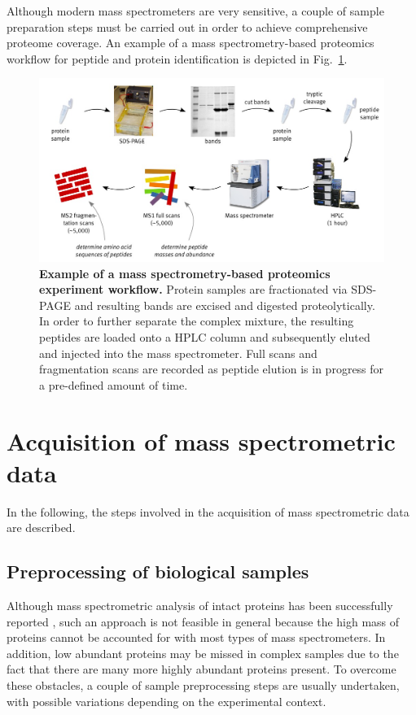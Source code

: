 Although modern mass spectrometers are very sensitive, a couple of sample 
preparation steps must be carried out in order to achieve comprehensive 
proteome coverage. 
An example of a mass spectrometry-based proteomics workflow for peptide 
and protein identification is depicted in Fig.~\ref{fig:proteomics-overview}.

\begin{figure}
\includegraphics[width=\textwidth]{figures/Proteomics.jpg}
\caption{
{\bf Example of a mass spectrometry-based proteomics experiment workflow.} 
Protein samples are fractionated via SDS-PAGE and resulting bands are excised and
digested proteolytically. In order to further separate the complex mixture, 
the resulting peptides are loaded onto a HPLC column and subsequently eluted 
and injected into the mass spectrometer. Full scans and fragmentation scans
are recorded as peptide elution is in progress for a pre-defined amount of time.
}
\label{fig:proteomics-overview}
\end{figure}

\section{Acquisition of mass spectrometric data}

In the following, the steps involved in the acquisition of mass spectrometric
data are described.

\subsection{Preprocessing of biological samples}

Although mass spectrometric analysis of intact proteins has been successfully
reported \citep{Lee2002, Taylor2003}, such an approach is not feasible in 
general because the high mass of proteins cannot be accounted for with most
types of mass spectrometers.
In addition, low abundant proteins may be missed in complex samples due to
the fact that there are many more highly abundant proteins present.
To overcome these obstacles, a couple of sample preprocessing steps are usually
undertaken, with possible variations depending on the experimental context.

